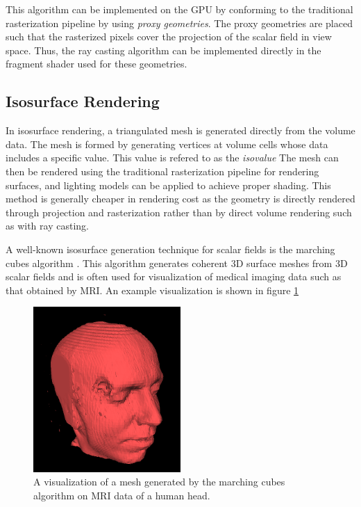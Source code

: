 \documentclass{article}
\begin{document}
This algorithm can be implemented on the GPU by conforming to the traditional rasterization pipeline by using \textit{proxy geometries}.
The proxy geometries are placed such that the rasterized pixels cover the projection of the scalar field in view space. Thus,
the ray casting algorithm can be implemented directly in the fragment shader used for these geometries. 

\subsection{Isosurface Rendering}
In isosurface rendering, a triangulated mesh is generated directly from the volume data.
The mesh is formed by generating vertices at volume cells whose data includes a specific value.
This value is refered to as the \textit{isovalue}
The mesh can then be rendered using the traditional rasterization pipeline for rendering surfaces, and 
lighting models can be applied to achieve proper shading. This method is generally cheaper in rendering cost as the
geometry is directly rendered through projection and rasterization rather than by direct volume rendering such as with
ray casting.

A well-known isosurface generation technique for scalar fields is the marching cubes algorithm \cite{lorensen1987marching}.
This algorithm generates coherent 3D surface meshes from 3D scalar fields and is often used for visualization of medical imaging
data such as that obtained by MRI. An example visualization is shown in figure \ref{fig:marchingCubesMRI}

\begin{figure}[tbh]
    \centering
    \includegraphics[width=0.5\textwidth]{images/Marchingcubes-head.png}
    \caption{A visualization of a mesh generated by the marching cubes algorithm on MRI data of a human head.}
    \label{fig:marchingCubesMRI}
\end{figure}



\end{document}
